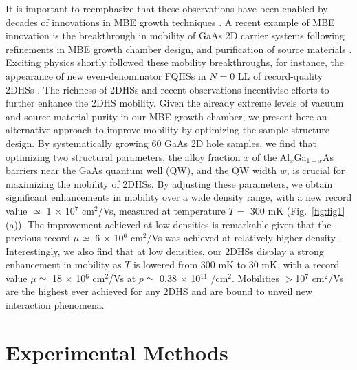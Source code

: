 \documentclass[reprint,amsmath,amssymb,aps,prl,nobibnotes,superscriptaddress]{revtex4-1}
\begin{document}
It is important to reemphasize that these observations have been enabled by decades of innovations in MBE growth techniques \cite{Pfeiffer2003, Manfra2014}. A recent example of MBE innovation is the breakthrough in mobility of GaAs 2D carrier systems following refinements in MBE growth chamber design, and purification of source materials \cite{Chung2021elec,Chung2022elec, Chung2022holes, Chung2018}. Exciting physics shortly followed these mobility breakthroughs, for instance, the appearance of new even-denominator FQHSs in $N=0$ LL of record-quality 2DHSs \cite{Wang2022}. The richness of 2DHSs and recent observations incentivise efforts to further enhance the 2DHS mobility. Given the already extreme levels of vacuum and source material purity in our MBE growth chamber, we present here an alternative approach to improve mobility by optimizing the sample structure design. By systematically growing 60 GaAs 2D hole samples, we find that optimizing two structural parameters, the alloy fraction $x$ of the Al$_x$Ga$_{1-x}$As barriers near the GaAs quantum well (QW), and the QW width $w$, is crucial for maximizing the mobility of 2DHSs. By adjusting these parameters, we obtain significant enhancements in mobility over a wide density range, with a new record value $\simeq$ 1 $\times$ 10$^7$ cm$^2$/Vs, measured at temperature $T=$ 300 mK (Fig.~\ref{fig:fig1}(a)). The improvement achieved at low densities is remarkable given that the previous record $\mu\simeq$ 6 $\times$ 10$^6$ cm$^2$/Vs was achieved at relatively higher density \cite{Chung2022holes}. Interestingly, we also find that at low densities, our 2DHSs display a strong enhancement in mobility as $T$ is lowered from 300 mK to 30 mK, with a record value $\mu\simeq$ 18 $\times$ 10$^6$ cm$^2$/Vs at $p\simeq$ 0.38 $\times$ 10$^{11}$  /cm$^{2}$. Mobilities $>$10$^7$ cm$^2$/Vs are the highest ever achieved for any 2DHS and are bound to unveil new interaction phenomena.

\section{Experimental Methods}
\end{document}
